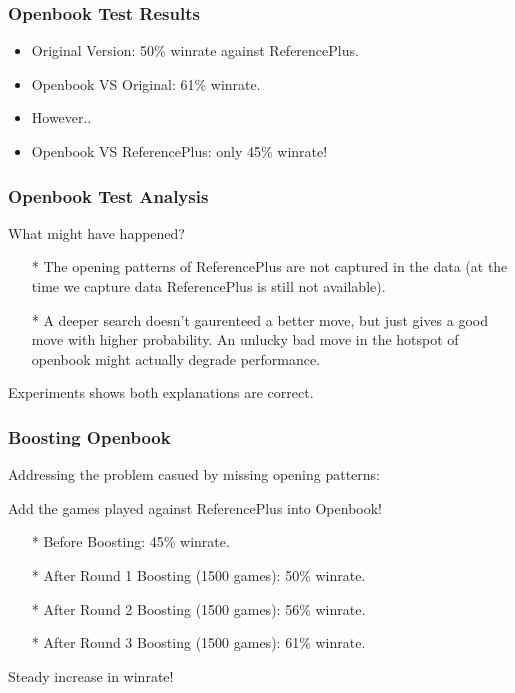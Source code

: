 \documentclass[10pt]{beamer}
\begin{document}
	\begin{frame}
		\frametitle{Openbook Test Results}

		\begin{itemize}
		\item Original Version: \textcolor{fgreen}{50\%} winrate against ReferencePlus.
		\item Openbook VS Original: \textcolor{fgreen}{61\%} winrate.\pause
		\item However..
		\item Openbook VS ReferencePlus: only \textcolor{dred}{45\%} winrate!
		\end{itemize}
	\end{frame}

	\begin{frame}
		\frametitle{Openbook Test Analysis}

		What might have happened?

		\begin{itemize}
		\item[*] The opening patterns of ReferencePlus are not captured in the data
		(at the time we capture data ReferencePlus is still not available).
		\item[*] A deeper search doesn't gaurenteed a better move, but just gives a good move with higher probability.
		An unlucky bad move in the hotspot of openbook might actually degrade performance.
		\end{itemize}

		Experiments shows \textcolor{fgreen}{both} explanations are correct.
	\end{frame}

	\begin{frame}
		\frametitle{Boosting Openbook}

		Addressing the problem casued by missing opening patterns:

		\textcolor{fgreen}{Add the games played against ReferencePlus into Openbook!}

		\begin{itemize}
		\item[*] Before Boosting: \textcolor{dred}{45\%} winrate.
		\item[*] After Round 1 Boosting (1500 games): \textcolor{fgreen}{50\%} winrate.
		\item[*] After Round 2 Boosting (1500 games): \textcolor{fgreen}{56\%} winrate.
		\item[*] After Round 3 Boosting (1500 games): \textcolor{fgreen}{61\%} winrate.
		\end{itemize}

		Steady increase in winrate!
	\end{frame}
\end{document}
